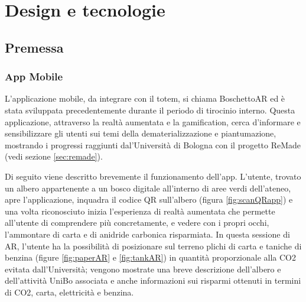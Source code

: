 \chapter{Design e tecnologie}
\section{Premessa}
\subsection{App Mobile}
L'applicazione mobile, da integrare con il totem, si chiama BoschettoAR \cite{repoBoschettoAR} ed è stata sviluppata precedentemente durante il periodo di tirocinio interno. Questa applicazione, attraverso la realtà aumentata e la gamification, cerca d'informare e sensibilizzare gli utenti sui temi della dematerializzazione e piantumazione, mostrando i progressi raggiunti dal'Università di Bologna con il progetto ReMade (vedi sezione \ref{sec:remade}).

Di seguito viene descritto brevemente il funzionamento dell'app.
L'utente, trovato un albero appartenente a un bosco digitale all'interno di aree verdi dell'ateneo, apre l'applicazione, inquadra il codice QR sull'albero (figura \ref{fig:scanQRapp}) e una volta riconosciuto inizia l'esperienza di realtà aumentata che permette all'utente di comprendere più concretamente, e vedere con i propri occhi, l'ammontare di carta e di anidride carbonica risparmiata. In questa sessione di AR, l'utente ha la possibilità di posizionare sul terreno plichi di carta e taniche di benzina (figure \ref{fig:paperAR} e \ref{fig:tankAR}) in quantità proporzionale alla CO2 evitata dall'Università; vengono mostrate una breve descrizione dell'albero e dell'attività UniBo associata e anche informazioni sui risparmi ottenuti in termini di CO2, carta, elettricità e benzina.

